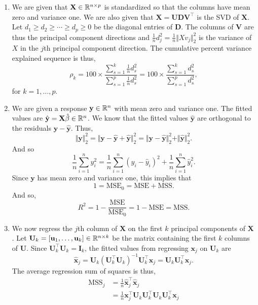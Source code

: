 \begin{enumerate}[label=(\alph*)]
    \item We are given that $\mathbf{X} \in \mathbb{R}^{n \times p}$  is standardized so that the columns have mean zero and variance one. We are also given that $\mathbf{X} = \mathbf{UDV}^\top$ is the SVD of $\mathbf{X}$. Let $d_1 \ge d_2 \ge \cdots \ge d_p \ge 0$ be the diagonal entries of $\mathbf{D}$. The columns of $\mathbf{V}$ are thus the principal component directions and $\frac{1}{n} d_j^2 = \frac{1}{n}\Vert Xv_j \Vert_2^2$ is the variance of $X$ in the $j$th principal component direction. The cumulative percent variance explained sequence is thus,
    \[\rho_k = 100 \times \frac{\sum_{s=1}^k \frac{1}{n}d_s^2}{\sum_{s=1}^p \frac{1}{n}d_s^2}  =100 \times \frac{\sum_{s=1}^k d_s^2}{\sum_{s=1}^p d_s^2} ,\]
    for $k=1,\ldots,p$.
    \item We are given a response $\mathbf{y} \in \mathbb{R}^n$ with mean zero and variance one. The fitted values are $\hat{\mathbf{y}}=\mathbf{X}\hat{\beta} \in \mathbb{R}^n$. We know that the fitted values $\hat{\mathbf{y}}$ are orthogonal to the residuals $\mathbf{y}-\hat{\mathbf{y}}$. Thus,
    \[\Vert \mathbf{y} \Vert_2^2 = \Vert \mathbf{y}-\hat{\mathbf{y}} + \hat{\mathbf{y}} \Vert_2^2 =\Vert \mathbf{y}-\hat{\mathbf{y}}\Vert_2^2 + \Vert \hat{\mathbf{y}} \Vert_2^2.  \]
    And so
    \[\frac{1}{n}\sum_{i=1}^n y_i^2 = \frac{1}{n}\sum_{i=1}^n(y_i-\hat{y}_i)^2 + \frac{1}{n}\sum_{i=1}^n \hat{y}_i^2. \]
    Since $\mathbf{y}$ has mean zero and variance one, this implies that
    \[1 = \mathrm{MSE}_0 = \mathrm{MSE} + \mathrm{MSS}. \]
    And so,
    \[R^2 = 1-\frac{\mathrm{MSE}}{\mathrm{MSE}_0} = 1-\mathrm{MSE} = \mathrm{MSS}. \]
    \item  We now regress the $j$th column of $\mathbf{X}$ on the first $k$ principal components of $\mathbf{X}$. Let $\mathbf{U}_k = [\mathbf{u}_1,\ldots,\mathbf{u}_k] \in \mathbb{R}^{n \times k}$ be the matrix containing the first $k$ columns of $\mathbf{U}$. Since $\mathbf{U}_k^\top \mathbf{U}_k = \mathbf{I}_k$, the fitted values from regressing $\mathbf{x}_j$ on $\mathbf{U}_k$ are
    \[\hat{\mathbf{x}}_j = \mathbf{U}_k(\mathbf{U}_k^\top \mathbf{U}_k)^{-1}\mathbf{U}_k^\top \mathbf{x}_j =  \mathbf{U}_k\mathbf{U}_k^\top \mathbf{x}_j.\]
    The average regression sum of squares is thus,
    \begin{align*}
        \mathrm{MSS}_j &=\frac{1}{n} \hat{\mathbf{x}}_j^\top \hat{\mathbf{x}}_j\\
        &=\frac{1}{n} \mathbf{x}_j^\top \mathbf{U}_k\mathbf{U}_k^\top \mathbf{U}_k \mathbf{U}_k^\top \mathbf{x}_j\\

\end{align*}
\end{enumerate}
